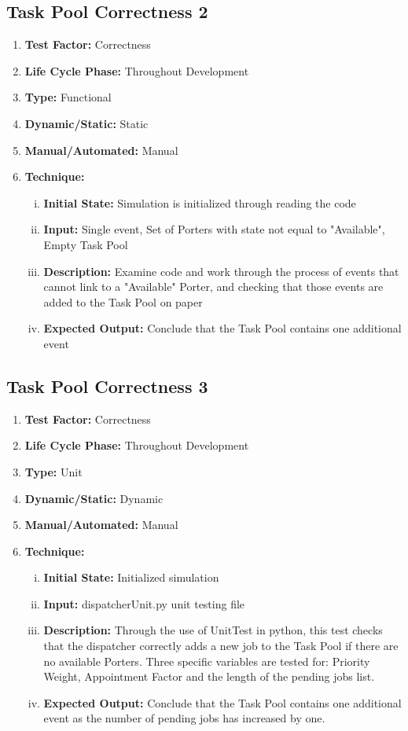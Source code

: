 \documentclass[paper=letter, fontsize=10pt]{scrartcl}
\numberwithin{equation}{section}		%
\numberwithin{figure}{section}			%
\numberwithin{table}{section}				%
\begin{document}
\subsection{Task Pool Correctness 2}
\begin{enumerate}[]
	\item \textbf{Test Factor:} Correctness
	\item \textbf{Life Cycle Phase:} Throughout Development
	\item \textbf{Type:} Functional
	\item \textbf{Dynamic/Static:} Static
	\item \textbf{Manual/Automated:} Manual
	\item \textbf{Technique:}
		\begin{enumerate}[(i)]
			\item \textbf{Initial State:} Simulation is initialized through reading the code
			\item \textbf{Input:} Single event, Set of Porters with state not equal to "Available", Empty Task Pool
			\item \textbf{Description:} Examine code and work through the process of events that cannot link to a "Available" Porter, and checking that those events are added to the Task Pool on paper
			\item \textbf{Expected Output:} Conclude that the Task Pool contains one additional event 
		\end{enumerate}
\end{enumerate}

\subsection{Task Pool Correctness 3}
\begin{enumerate}[]
	\item \textbf{Test Factor:} Correctness
	\item \textbf{Life Cycle Phase:} Throughout Development
	\item \textbf{Type:} Unit
	\item \textbf{Dynamic/Static:} Dynamic
	\item \textbf{Manual/Automated:} Manual
	\item \textbf{Technique:}
		\begin{enumerate}[(i)]
			\item \textbf{Initial State:} Initialized simulation
			\item \textbf{Input:} dispatcherUnit.py unit testing file
			\item \textbf{Description:} Through the use of UnitTest in python, this test checks that the dispatcher correctly adds a new job to the Task Pool if there are no available Porters. Three specific variables are tested for: Priority Weight, Appointment Factor and the length of the pending jobs list.
			\item \textbf{Expected Output:} Conclude that the Task Pool contains one additional event as the number of pending jobs has increased by one.
		\end{enumerate}
\end{enumerate}
\end{document}

